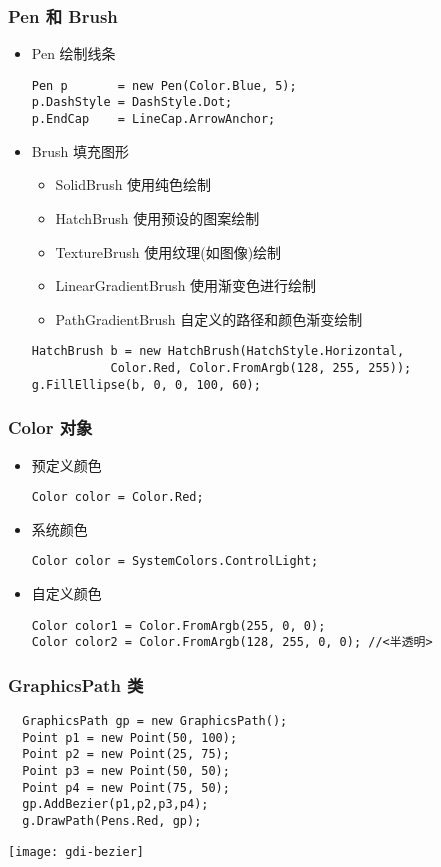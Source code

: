 \begin{frame}[fragile]
\frametitle{Pen 和 Brush}
\begin{itemize}
\item Pen 绘制线条
\begin{lstlisting}
Pen p       = new Pen(Color.Blue, 5);
p.DashStyle = DashStyle.Dot;
p.EndCap    = LineCap.ArrowAnchor;
\end{lstlisting}
\item Brush 填充图形
\begin{itemize}
\item SolidBrush 使用纯色绘制
\item HatchBrush 使用预设的图案绘制
\item TextureBrush 使用纹理(如图像)绘制
\item LinearGradientBrush 使用渐变色进行绘制
\item PathGradientBrush 自定义的路径和颜色渐变绘制
\end{itemize}
\begin{lstlisting}
HatchBrush b = new HatchBrush(HatchStyle.Horizontal,
           Color.Red, Color.FromArgb(128, 255, 255));
g.FillEllipse(b, 0, 0, 100, 60);
\end{lstlisting}
\end{itemize}
\end{frame}

\begin{frame}[fragile]
\frametitle{Color 对象}
\begin{itemize}
\item 预定义颜色
\begin{lstlisting}
Color color = Color.Red;
\end{lstlisting}
\item 系统颜色
\begin{lstlisting}
Color color = SystemColors.ControlLight;
\end{lstlisting}
\item 自定义颜色
\begin{lstlisting}[escapeinside=<>]
Color color1 = Color.FromArgb(255, 0, 0);
Color color2 = Color.FromArgb(128, 255, 0, 0); //<半透明>
\end{lstlisting}
\end{itemize}
\end{frame}

\begin{frame}[fragile]
\frametitle{GraphicsPath 类}
\begin{lstlisting}
  GraphicsPath gp = new GraphicsPath();
  Point p1 = new Point(50, 100);
  Point p2 = new Point(25, 75);
  Point p3 = new Point(50, 50);
  Point p4 = new Point(75, 50);
  gp.AddBezier(p1,p2,p3,p4);
  g.DrawPath(Pens.Red, gp);
\end{lstlisting}
\centering \texttt{[image: gdi-bezier]}
\end{frame}

